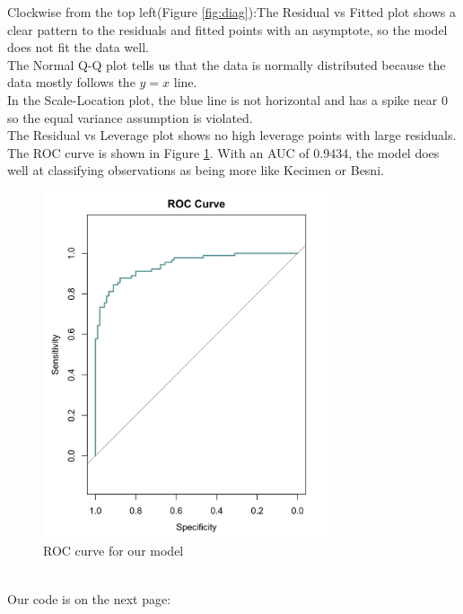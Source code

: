 \documentclass{article}
\begin{document}
\clearpage
Clockwise from the top left(Figure \ref{fig:diag}):The Residual vs Fitted plot shows a clear pattern to the residuals and fitted points with an asymptote, so the model does not fit the data well.\\
The Normal Q-Q plot tells us that the data is normally distributed because the data mostly follows the $y=x$ line.\\
In the Scale-Location plot, the blue line is not horizontal and has a spike near 0 so the equal variance assumption is violated.\\
The Residual vs Leverage plot shows no high leverage points with large residuals. \\
The ROC curve is shown in Figure \ref{fig:roc}. With an AUC of 0.9434, the model does well at classifying observations as being more like Kecimen or Besni.
\begin{figure}[ht]
	\centering
	\includegraphics[width=0.75\textwidth]{roc_curve}
\caption{ROC curve for our model}
\label{fig:roc}
\end{figure} \\
Our code is on the next page:
\clearpage
\end{document}
